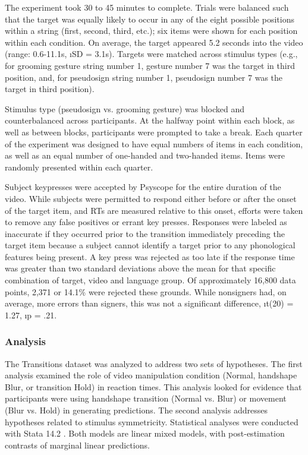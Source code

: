             The experiment took 30 to 45 minutes to complete. Trials were balanced such that the target was equally likely to occur in any of the eight possible positions within a string (first, second, third, etc.); six items were shown for each position within each condition. On average, the target appeared 5.2 seconds into the video (range: 0.6-11.1s, \i{SD} = 3.1s). Targets were matched across stimulus types (e.g., for grooming gesture string number 1, gesture number 7 was the target in third position, and, for pseudosign string number 1, pseudosign number 7 was the target in third position).\par
            Stimulus type (pseudosign vs. grooming gesture) was blocked and counterbalanced across participants. At the halfway point within each block, as well as between blocks, participants were prompted to take a break. Each quarter of the experiment was designed to have equal numbers of items in each condition, as well as an equal number of one-handed and two-handed items. Items were randomly presented within each quarter. \par
            Subject keypresses were accepted by Psyscope \cite{psyscope} for the entire duration of the video. While subjects were permitted to respond either before or after the onset of the target item, and RTs are measured relative to this onset, efforts were taken to remove any false positives or errant key presses. Responses were labeled as inaccurate if they occurred prior to the transition immediately preceding the target item because a subject cannot identify a target prior to any phonological features being present. A key press was rejected as too late if the response time was greater than two standard deviations above the mean for that specific combination of target, video and language group. Of approximately 16,800 data points, 2,371 or 14.1\% were rejected these grounds. While nonsigners had, on average, more errors than signers, this was not a significant difference, \i{t}(20) = 1.27, \i{p} = .21. 
        \subsubsection{Analysis}
            The Transitions dataset was analyzed to address two sets of hypotheses. The first analysis examined the role of video manipulation condition (Normal, handshape Blur, or transition Hold) in reaction times. This analysis looked for evidence that participants were using handshape transition (Normal vs. Blur) or movement (Blur vs. Hold) in generating predictions. The second analysis addresses hypotheses related to stimulus symmetricity. Statistical analyses were conducted with Stata 14.2 \cite{stata14}. Both models are linear mixed models, with post-estimation contrasts of marginal linear predictions. \par
